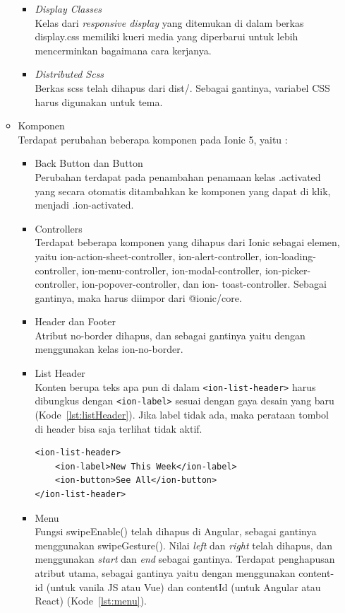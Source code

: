 \begin{enumerate}
\begin{itemize}
\begin{itemize}
			\item {\it Display Classes} \\ 
			Kelas dari {\it responsive display} yang ditemukan di dalam berkas display.css memiliki kueri media yang diperbarui untuk lebih mencerminkan bagaimana cara kerjanya.

			\item {\it Distributed Scss} \\
			Berkas scss telah dihapus dari dist/. Sebagai gantinya, variabel CSS harus digunakan untuk tema.

		\end{itemize}

		\item Komponen\\
		Terdapat perubahan beberapa komponen pada Ionic 5, yaitu :
		\begin{itemize}
			\item Back Button dan Button  \\
			Perubahan terdapat pada penambahan penamaan kelas .activated yang secara otomatis ditambahkan ke komponen yang dapat di klik, menjadi .ion-activated.
			
			\item Controllers\\
			Terdapat beberapa komponen yang dihapus dari Ionic sebagai elemen, yaitu ion-action-sheet-controller, ion-alert-controller, ion-loading-controller, ion-menu-controller, ion-modal-controller, ion-picker-controller, ion-popover-controller, dan ion- toast-controller. Sebagai gantinya, maka harus diimpor dari @ionic/core. 
			\item Header dan Footer\\
			Atribut no-border dihapus, dan sebagai gantinya yaitu dengan menggunakan kelas ion-no-border.
			
			\item List Header\\
			Konten berupa teks apa pun di dalam \texttt{<ion-list-header>} harus dibungkus dengan \texttt{<ion-label>} sesuai dengan gaya desain yang baru (Kode~\ref{lst:listHeader}). Jika label tidak ada, maka perataan tombol di header bisa saja terlihat tidak aktif. 

\begin{lstlisting}[label={lst:listHeader}, caption=Kode Program untuk List Header]
<ion-list-header>
	<ion-label>New This Week</ion-label>
	<ion-button>See All</ion-button>
</ion-list-header>
\end{lstlisting}
			\item Menu\\
			Fungsi swipeEnable() telah dihapus di Angular, sebagai gantinya menggunakan swipeGesture(). Nilai {\it left} dan {\it right} telah dihapus, dan menggunakan {\it start} dan {\it end} sebagai gantinya. Terdapat penghapusan atribut utama, sebagai gantinya yaitu dengan menggunakan content-id (untuk vanila JS atau Vue) dan contentId (untuk Angular atau React) (Kode~\ref{lst:menu}).			
			

\end{itemize}
\end{itemize}
\end{enumerate}
